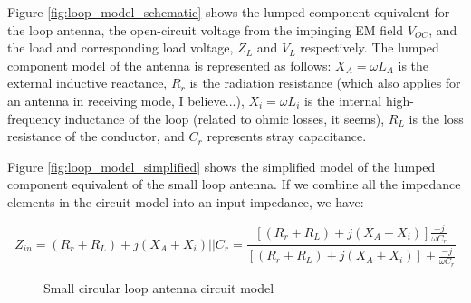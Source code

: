 \documentclass[12pt,onecolumn,titlepage]{article}
\begin{document}
Figure \ref{fig:loop_model_schematic} shows the lumped component equivalent for the loop antenna, the open-circuit voltage from the impinging EM field $V_{OC}$, and the load and corresponding load voltage, $Z_L$ and $V_L$ respectively. The lumped component model of the antenna is represented as follows: $X_A = \omega L_A$ is the external inductive reactance, $R_r$ is the radiation resistance (which also applies for an antenna in receiving mode, I believe...), $X_i = \omega L_i$ is the internal high-frequency inductance of the loop (related to ohmic losses, it seems), $R_L$ is the loss resistance of the conductor, and $C_r$ represents stray capacitance. 


Figure \ref{fig:loop_model_simplified} shows the simplified model of the lumped component equivalent of the small loop antenna. If we combine all the impedance elements in the circuit model into an input impedance, we have:

\[Z_{in} = (R_r + R_L) + j(X_A + X_i) || C_r = \frac{ \left[ (R_r + R_L) + j(X_A + X_i) \right] \frac{-j}{\omega C_r}}{ \left[ (R_r + R_L) + j(X_A + X_i) \right] + \frac{-j}{\omega C_r}} \]


\begin{figure}[htbp]
	\centering
		\quad
		\quad
	\label{fig:schematic_loop_model}
	\caption{Small circular loop antenna circuit model}
\end{figure}
\end{document}
